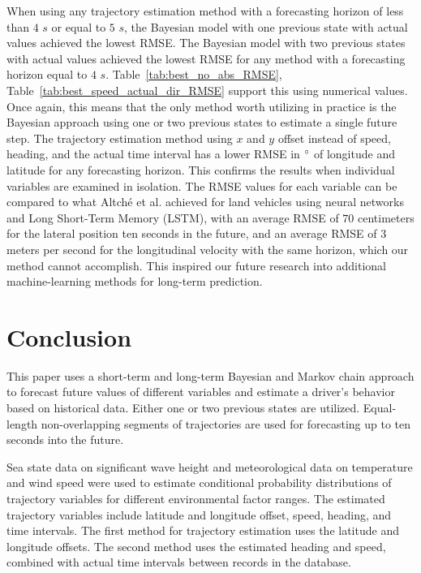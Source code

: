 \documentclass[preprint,12pt]{elsarticle}
\begin{document}
When using any trajectory estimation method with a forecasting horizon of less than $4$ $s$ or equal to $5$ $s$, the Bayesian model with one previous state with actual values achieved the lowest RMSE. The Bayesian model with two previous states with actual values achieved the lowest RMSE for any method with a forecasting horizon equal to $4$ $s$. Table~\ref{tab:best_no_abs_RMSE}, Table~\ref{tab:best_speed_actual_dir_RMSE} support this using numerical values. Once again, this means that the only method worth utilizing in practice is the Bayesian approach using one or two previous states to estimate a single future step. The trajectory estimation method using $x$ and $y$ offset instead of speed, heading, and the actual time interval has a lower RMSE in $\degree$ of longitude and latitude for any forecasting horizon. This confirms the results when individual variables are examined in isolation. The RMSE values for each variable can be compared to what Altché et al. \citep{altche2017lstm} achieved for land vehicles using neural networks and Long Short-Term Memory (LSTM), with an average RMSE of $70$ centimeters for the lateral position ten seconds in the future, and an average RMSE of $3$ meters per second for the longitudinal velocity with the same horizon, which our method cannot accomplish. This inspired our future research into additional machine-learning methods for long-term prediction.

\section{Conclusion}
\label{sec:Conclusion}

This paper uses a short-term and long-term Bayesian and Markov chain approach to forecast future values of different variables and estimate a driver's behavior based on historical data. Either one or two previous states are utilized. Equal-length non-overlapping segments of trajectories are used for forecasting up to ten seconds into the future.

Sea state data on significant wave height and meteorological data on temperature and wind speed were used to estimate conditional probability distributions of trajectory variables for different environmental factor ranges. The estimated trajectory variables include latitude and longitude offset, speed, heading, and time intervals. The first method for trajectory estimation uses the latitude and longitude offsets. The second method uses the estimated heading and speed, combined with actual time intervals between records in the database.
\end{document}
